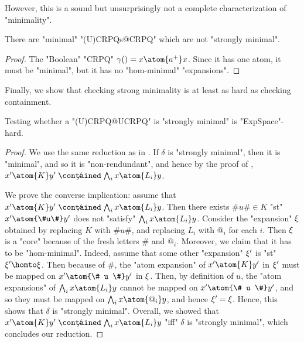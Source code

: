 However, this is a sound but unsurprisingly not a complete characterization of "minimality".

\begin{proposition}
	There are "minimal" "(U)CRPQs@CRPQ" which are not "strongly minimal". 
\end{proposition}

\begin{proof}
	The "Boolean" "CRPQ" $\gamma() = x \atom{a^+} x$. Since it has one atom, it must be "minimal", but it has no "hom-minimal" "expansions".
\end{proof}

Finally, we show that checking strong minimality is at least as hard as checking containment.

\begin{proposition}
	\AP\label{prop:lowerbound-strong-minimality}
	Testing whether a "(U)CRPQ@UCRPQ" is "strongly minimal" is "ExpSpace"-hard.
\end{proposition}

\begin{proof}
	We use the same reduction as in .
	If $\delta$ is "strongly minimal", then it is "minimal", and so it is
	"non-rendundant", and hence
	by the proof of ,
	$x' \atom{K} y' \centernot{\contained} \bigwedge_i x \atom{L_i} y$.
	
	We prove the converse implication: assume that
		$x' \atom{K} y' \centernot{\contained} \bigwedge_i x \atom{L_i} y$.
	Then there exists $\#u\# \in K$ "st" $x' \atom{\#u\#} y'$
	does not "satisfy" $\bigwedge_i x \atom{L_i} y$.
	Consider the "expansion" $\xi$ obtained by replacing $K$ with $\#u\#$, and replacing 
	$L_i$ with $@_i$ for each $i$.
	Then $\xi$ is a "core" because of the fresh letters $\#$ and $@_i$.
	Moreover, we claim that it has to be "hom-minimal".
	Indeed, assume that some other "expansion" $\xi'$ is "st" $\anexpansion'\homto \anexpansion$.
	Then because of $\#$, the "atom expansion" of $x' \atom{K} y'$ in $\xi'$ 
	must be mapped on $x' \atom{\# u \#} y'$ in $\xi$.
	Then, by definition of $u$, the "atom expansions" of $\bigwedge_i x \atom{L_i} y$
	cannot be mapped on $x' \atom{\# u \#} y'$, and so they must be mapped on
	$\bigwedge_i x \atom{@_i} y$, and hence $\xi' = \xi$.
	Hence, this shows that $\delta$ is "strongly minimal".
	Overall, we showed that $x' \atom{K} y' \centernot{\contained} \bigwedge_i x \atom{L_i} y$
	"iff" $\delta$ is "strongly minimal", which concludes our reduction.
\end{proof}